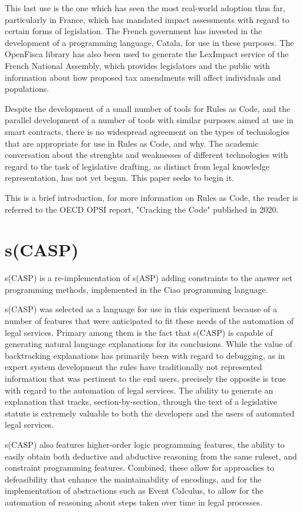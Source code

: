 \documentclass[sigconf]{acmart}
\begin{document}
This last use is the one which has seen the most real-world adoption thus far,
particularly in France, which has mandated impact assessments with
regard to certain forms of legislation.
The French government has invested in the development of a
programming language, Catala, for use in these purposes.
The OpenFisca library has also been used to
generate the LexImpact service of the French National Assembly, which provides 
legislators and the public
with information about how proposed tax amendments will affect individuals and 
populations.

Despite the development of a small number of tools for Rules as
Code, and the parallel development of a number of tools with similar purposes
aimed at
use in smart contracts, 
there is no widespread agreement on the types of technologies
that are appropriate for use in Rules as Code, and why. The academic conversation
about the strenghts and weaknesses of different technologies with regard to the
task of legislative drafting, as distinct from legal knowledge representation,
has not yet begun. This paper seeks to begin it.

This is a brief introduction, for more information on Rules as Code, the reader is referred to the OECD OPSI
report, "Cracking the Code" published in 2020.

\section{s(CASP)}

s(CASP) is a re-implementation of s(ASP) adding constraints to the answer set programming methods, implemented
in the Ciao programming language.

s(CASP) was selected as a language for use in this experiment because of a number of features that were anticipated to fit these needs of the automation of legal
services. Primary among them is the fact that s(CASP) is capable of generating natural language explanations for its conclusions.
While the value of backtracking explanations has primarily been with regard to
debugging, as in expert system development the rules have traditionally not
represented information that was pertinent to the end users, precisely the opposite
is true with regard to the automation of legal services. The ability to generate
an explanation that tracks, section-by-section, through the text of a legislative
statute is extremely valuable to both the developers and the users of automated
legal services.

s(CASP) also features higher-order logic programming features, the ability
to easily obtain both deductive and abductive reasoning from the same ruleset, and
constraint programming features. Combined, these allow for approaches to defeasibility
that enhance the maintainability of encodings, and for the implementation of
abstractions such as Event Calculus, to allow for the automation of reasoning about
steps taken over time in legal processes.
\end{document}
